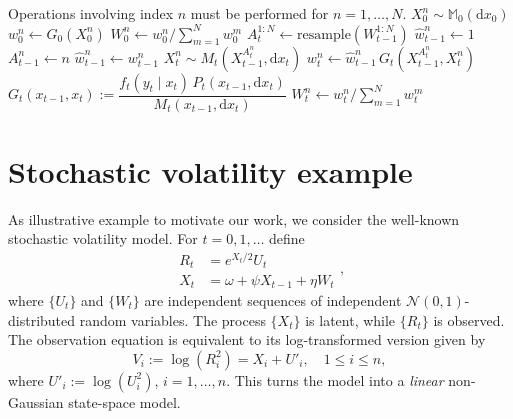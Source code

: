 \documentclass[11pt,reqno]{amsart}
\renewcommand{\scr}[1]{{\mathcal #1}}
\theoremstyle{definition}
\begin{document}
\begin{algorithm}\label{alg:guided_pf}
\caption{Guided particle filter (GPF)}
\begin{algorithmic}[1]
\Statex Operations involving index $n$ must be performed for $n=1,\ldots,N$.
\State $X_0^n \sim \mathbb{M}_0(\mathrm{d}x_0)$
\State $w_0^n \leftarrow G_0(X_0^n)$ 
\State $W_0^n \leftarrow w_0^n / \sum_{m=1}^N w_0^m$
        \State $A_t^{1:N} \leftarrow \mathrm{resample}(W_{t-1}^{1:N})$
        \State $\widehat{w}_{t-1}^n \leftarrow 1$
    \Else
        \State $A_{t-1}^n \leftarrow n$
        \State $\widehat{w}_{t-1}^n \leftarrow w_{t-1}^n$
    \EndIf
    \State $X_t^n \sim M_t(X_{t-1}^{A_t^n}, \mathrm{d}x_t)$
    \State $w_t^n \leftarrow \widehat{w}_{t-1}^n \, G_t(X_{t-1}^{A_t^n}, X_t^n)$ 
    \Statex \hspace{2.5em} $G_t(x_{t-1}, x_t) := \dfrac{f_t(y_t \mid x_t)\, P_t(x_{t-1}, \mathrm{d}x_t)}{M_t(x_{t-1}, \mathrm{d}x_t)}$
    \State $W_t^n \leftarrow w_t^n / \sum_{m=1}^N w_t^m$
\EndFor
\end{algorithmic}
\end{algorithm}



\section{Stochastic volatility example}\label{sec:stochvol}
As  illustrative example to motivate our work, we consider the well-known stochastic volatility model. For $t=0,1,\ldots$ define 
\begin{equation}
\label{latent}
\begin{split}
	R_t &= e^{X_t/2} U_t\\
	    X_t &= \omega + \psi X_{t - 1} + \eta W_t
\end{split},
\end{equation}
where $\{U_t\}$ and $\{W_t\}$ are independent sequences of independent $\scr{N}(0,1)$-distributed random variables. The process $\{X_t\}$ is latent, while $\{R_t\}$ is observed. 
The observation equation is equivalent to its log-transformed version given by 
\begin{equation}\label{v_obs}
    V_i := \log\left(R_i^2\right) = X_i + U'_i, \quad 1 \leq i \leq n,
\end{equation}
where $U'_i := \log\left(U_i^2\right)$, $i = 1, \dots, n$. This turns the model into a {\it linear} non-Gaussian state-space model. 
\end{document}
